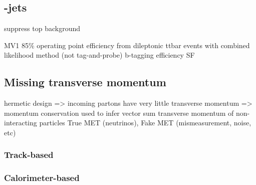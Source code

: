 \subsection{\Pbottom-jets}
\label{sec:objects:bjets}

suppress top background

MV1 85\% operating point
efficiency from dileptonic ttbar events with combined likelihood method (not tag-and-probe)
b-tagging efficiency SF


\subsection{Missing transverse momentum}
\label{sec:objects:met}

hermetic design => incoming partons have very little transverse momentum => momentum conservation used to infer vector sum transverse momentum of non-interacting particles
True MET (neutrinos), Fake MET (mismeasurement, noise, etc)

\subsubsection{Track-based \met}

\subsubsection{Calorimeter-based \met}

